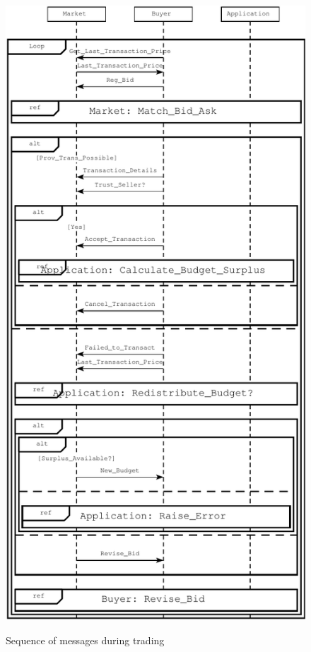 \documentclass[10pt,journal,compsoc]{IEEEtran}
\begin{document}
\begin{figure}
	\centering
	\includegraphics[scale=0.3]{drawings/trading_phase.auml.pdf}
	\label{trading_phase}
	\caption{Sequence of messages during trading}
\end{figure}
\end{document}
